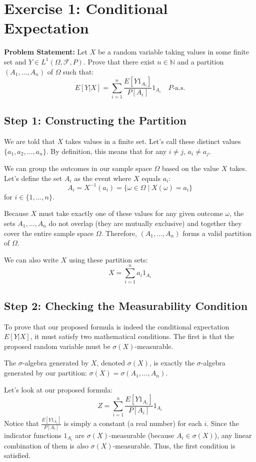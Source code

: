 \section{Exercise 1: Conditional Expectation}

\textbf{Problem Statement:} Let $X$ be a random variable taking values in some finite set and $Y \in L^1(\Omega, \mathcal{F}, P)$. Prove that there exist $n \in \mathbb{N}$ and a partition $(A_1, \dots, A_n)$ of $\Omega$ such that:
\[ E[Y|X] = \sum_{i=1}^n \frac{E[Y 1_{A_i}]}{P[A_i]} 1_{A_i} \quad P\text{-a.s.} \]

\subsection*{Step 1: Constructing the Partition}
We are told that $X$ takes values in a finite set. Let's call these distinct values $\{a_1, a_2, \dots, a_n\}$. By definition, this means that for any $i \neq j$, $a_i \neq a_j$.

We can group the outcomes in our sample space $\Omega$ based on the value $X$ takes. Let's define the set $A_i$ as the event where $X$ equals $a_i$:
\[ A_i = X^{-1}(a_i) = \{\omega \in \Omega \mid X(\omega) = a_i\} \]
for $i \in \{1, \dots, n\}$.

Because $X$ must take exactly one of these values for any given outcome $\omega$, the sets $A_1, \dots, A_n$ do not overlap (they are mutually exclusive) and together they cover the entire sample space $\Omega$. Therefore, $(A_1, \dots, A_n)$ forms a valid partition of $\Omega$. 

We can also write $X$ using these partition sets:
\[ X = \sum_{i=1}^n a_i 1_{A_i} \]

\subsection*{Step 2: Checking the Measurability Condition}
To prove that our proposed formula is indeed the conditional expectation $E[Y|X]$, it must satisfy two mathematical conditions. The first is that the proposed random variable must be $\sigma(X)$-measurable.

The $\sigma$-algebra generated by $X$, denoted $\sigma(X)$, is exactly the $\sigma$-algebra generated by our partition: $\sigma(X) = \sigma(A_1, \dots, A_n)$. 

Let's look at our proposed formula:
\[ Z = \sum_{i=1}^n \frac{E[Y 1_{A_i}]}{P[A_i]} 1_{A_i} \]
Notice that $\frac{E[Y 1_{A_i}]}{P[A_i]}$ is simply a constant (a real number) for each $i$. Since the indicator functions $1_{A_i}$ are $\sigma(X)$-measurable (because $A_i \in \sigma(X)$), any linear combination of them is also $\sigma(X)$-measurable. Thus, the first condition is satisfied.


